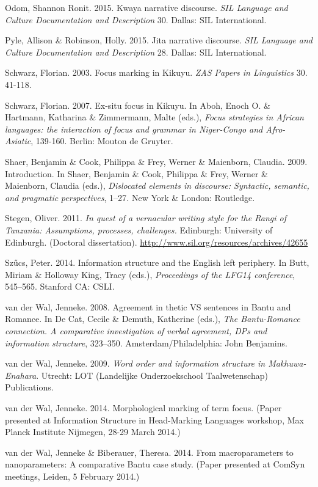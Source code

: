 \documentclass[output=paper]{langsci/langscibook}
\begin{document}
Odom, Shannon Ronit. 2015. Kwaya narrative discourse. \textit{SIL Language and Culture Documentation and Description} 30. Dallas: SIL International.

Pyle, Allison \& Robinson, Holly. 2015. Jita narrative discourse. \textit{SIL Language and C}\textit{ulture Documentation and Description} 28. Dallas: SIL International.

Schwarz, Florian. 2003. Focus marking in Kikuyu. \textit{ZAS Papers in Linguistics} 30. 41-118.

Schwarz, Florian. 2007. Ex-situ focus in Kikuyu. In Aboh, Enoch O. \& Hartmann, Katharina \& Zimmermann, Malte (eds.), \textit{Focus strategies in African languages: the interaction of focus and grammar in Niger-Congo and Afro-Asiatic}, 139-160. Berlin: Mouton de Gruyter.

Shaer, Benjamin \& Cook, Philippa \& Frey, Werner \& Maienborn, Claudia. 2009. Introduction. In Shaer, Benjamin \& Cook, Philippa \& Frey, Werner \& Maienborn, Claudia (eds.), \textit{Dislocated elements in discourse: Syntactic, semantic, and pragmatic}\textit{ perspectives}, 1–27\textit{.} New York \& London: Routledge.

Stegen, Oliver. 2011. \textit{In quest of a vernacular writing style for the Rangi of Tanzania: Assumptions, processes, challenges.} Edinburgh: University of Edinburgh. (Doctoral dissertation). \url{http://www.sil.org/resources/archives/42655}

Szűcs, Peter. 2014. Information structure and the English left periphery. In Butt, Miriam \& Holloway King, Tracy (eds.), \textit{Proceedings of the LFG14 conference}, 545–565. Stanford CA: CSLI.

van der Wal, Jenneke. 2008. Agreement in thetic VS sentences in Bantu and Romance. In De Cat, Cecile \& Demuth, Katherine (eds.), \textit{The Bantu-Romance connection. A comparative investigation of verbal agreement, DPs and information structure}, 323–350. Amsterdam/Philadelphia: John Benjamins.

van der Wal, Jenneke. 2009. \textit{Word order and information structure in Makhuwa-Enahara}. Utrecht: LOT (Landelijke Onderzoekschool Taalwetenschap) Publications.

van der Wal, Jenneke. 2014. Morphological marking of term focus. (Paper presented at Information Structure in Head-Marking Languages workshop, Max Planck Institute Nijmegen, 28-29 March 2014.)

van der Wal, Jenneke \& Biberauer, Theresa. 2014. From macroparameters to nanoparameters: A comparative Bantu case study. (Paper presented at ComSyn meetings, Leiden, 5 February 2014.)
\end{document}

